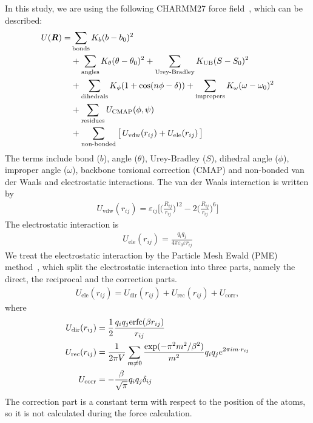 \documentclass[aip,jcp,a4paper,reprint,onecolumn]{revtex4-1}
\newcommand{\vect}[1]{\textbf{\textit{#1}}}
\newcommand{\vdw}{\textrm{vdw}}
\newcommand{\ele}{\textrm{ele}}
\newcommand{\dir}{\textrm{dir}}
\newcommand{\rec}{\textrm{rec}}
\newcommand{\corr}{\textrm{corr}}
\newcommand{\eps}{\varepsilon}
\begin{document}
In this study, we are using the following CHARMM27 force field~\cite{mackerell2004extending}, which can be described:
\begin{align}\nonumber
  U(\vect R) = &
  \sum_{\textrm{bonds}} K_b(b-b_0)^2\\\nonumber
  &
  +\sum_{\textrm{angles}} K_\theta (\theta - \theta_0)^2
  +\sum_{\textrm{Urey-Bradley}} K_{\textrm{UB}} (S - S_0)^2\\\nonumber
  &
  +\sum_{\textrm{dihedrals}} K_\phi( 1+\cos(n\phi - \delta)) 
  +\sum_{\textrm{impropers}} K_\omega (\omega - \omega_0)^2\\ \nonumber
  &
  +\sum_{\textrm{residues}} U_{\textrm{CMAP}}(\phi, \psi) \\\label{eqn:tmp13}
  &
  +\sum_{\textrm{non-bonded}}
  \big[\,U_{\vdw}(r_{ij}) + U_{\ele}(r_{ij})\,\big]
\end{align}
The terms include bond ($b$), angle ($\theta$), Urey-Bradley ($S$),
dihedral angle ($\phi$), improper angle ($\omega$), backbone torsional
correction (CMAP) and non-bonded van der Waals and electrostatic
interactions.  The van der Waals interaction is written by
\begin{align}
  U_{\vdw}(r_{ij}) = 
  \eps_{ij}
  \bigg[\bigg(\frac{R_{ij}}{r_{ij}}\bigg)^{12}
  - 2\bigg(\frac{R_{ij}}{r_{ij}}\bigg)^{6}
  \bigg]
\end{align}
The electrostatic interaction is
\begin{align}
  U_{\ele}(r_{ij}) = \frac{q_iq_j}{4\pi\eps_0\eps r_{ij}}
\end{align}
We treat the electrostatic interaction by the Particle Mesh Ewald (PME)
method~\cite{darden1993pme, essmann1995spm}, which split the electrostatic interaction into three parts,
namely the direct, the reciprocal and the correction parts.
\begin{align}
  U_{\ele}(r_{ij}) =
  U_{\dir}(r_{ij}) +
  U_{\rec}(r_{ij}) + U_{\corr},
\end{align}
where
\begin {align}
  U_{\dir} (r_{ij})& = \frac12 
  \frac{q_iq_j \textrm{erfc}(\beta {r}_{ij})}
  {{r}_{ij} } \\
  U_{\rec} (r_{ij})& = \frac1{2\pi V} \sum_{\vect m \neq 0}
  \frac{\exp(-\pi^2 m^2 / \beta^2)}{m^2}
   q_iq_j e^ {2 \pi i m \cdot r_{ij}}\\
  U_{\corr}& = -\frac\beta{\sqrt \pi} q_iq_j \delta_{ij}
\end {align}
The correction part is a constant term with respect to the position of
the atoms, so it is not calculated during
the force calculation.\\
\end{document}
